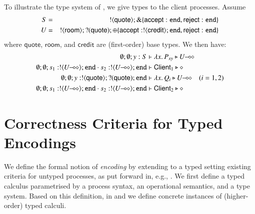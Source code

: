 \documentclass[preprint,11pt]{elsarticle}
\newtheorem{proposition}{Proposition}[section]
\newtheorem{example}{Example}[section]
\newcommand{\rtype}{\mathsf{room}}
\newcommand{\Quote}{\mathsf{quote}}
\newcommand{\accept}{\mathsf{accept}}
\newcommand{\reject}{\mathsf{reject}}
\newcommand{\creditc}{\mathsf{credit}}
\newcommand{\Client}{\mathsf{Client}}
\begin{document}
{ 


To illustrate the type system of \HOp, we give types to the client
processes. %
Assume 
\begin{eqnarray*}
S & = & \btout{\Quote} \btbra{\accept: \tinact, \reject: \tinact} \\
U & = & \btout{\rtype} \btinp{\Quote} \btsel{\accept: \btout{\creditc} \tinact, \reject: \tinact }
\end{eqnarray*}
where $\Quote$, $\rtype$, and $\creditc$ are (first-order) base types.
We then have:
\begin{align*}
\es; \es; y: S & \proves \abs{x}{P_{xy}} \hastype \lhot{U}
\\
	\es; \es; s_1: \btout{\lhot{U}} \tinact \cat s_2: \btout{\lhot{U}} \tinact & \proves \Client_1 \hastype \Proc
\\
	\es; \es; y: \btout{\Quote} \btinp{\Quote} \tinact &\proves \abs{x}{Q_i} \hastype \lhot{U}
 \quad (i=1,2)
 \\
	\es; \es; s_1: \btout{\lhot{U}} \tinact \cat s_2: \btout{\lhot{U}} \tinact & \proves \Client_2 \hastype \Proc
\end{align*}

%

\section{Correctness Criteria for Typed Encodings}
\label{s:expr}
%
We define the formal notion of \emph{encoding} by 
extending to a typed setting existing criteria for untyped processes, as put forward in, e.g.,
\cite{Nestmann00,Palamidessi03,DBLP:conf/lics/PalamidessiSVV06,DBLP:journals/iandc/Gorla10,DBLP:conf/icalp/LanesePSS10,DBLP:journals/tcs/FuL10,DBLP:journals/corr/abs-1208-2750,DBLP:conf/esop/PetersNG13}. 
We first define a typed calculus parametrised by a process syntax, an operational semantics, and a type system.
Based on this definition, in  
 and 
we define concrete instances of (higher-order) typed calculi.
}
\end{document}

